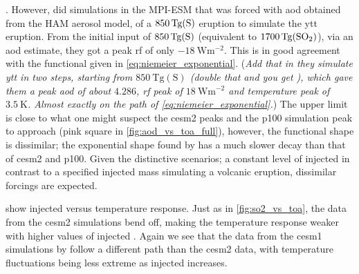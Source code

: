 \documentclass{ametsocV5}
\newcommand{\iso}[1][i]{{#1}njected \ce{SO2}}
\begin{document}
\citet{ottobliesner2016}. However, \citet{timmreck2010} did simulations in the MPI-ESM
that was forced with \ac{aod} obtained from the HAM aerosol model, of a
\(\SI{850}{\tera\gram(\ce{S})}\) eruption to simulate the \ac{ytt} eruption. From the
initial input of \(\SI{850}{\tera\gram(\ce{S})}\) (equivalent to
\(\SI{1700}{\tera\gram(\ce{SO2})}\)), via an \ac{aod} estimate, they got a peak \ac{rf}
of only \(\SI{-18}{\watt\metre^{-2}}\). This is in good agreement with the functional
given in \cref{eq:niemeier_exponential}. (\emph{Add that in \citet{timmreck2010} they
  simulate \ac{ytt} in two steps, starting from \(\SI{850}{\tera\gram(\mathrm{S})}\)
  (double that and you get ), which gave them a peak \ac{aod} of about
  \(\num{4.286}\), \ac{rf} peak of \(\SI{18}{\watt\metre^{-2}}\) and temperature peak of
  \(\SI{3.5}{\kelvin}\). Almost exactly on the path of \cref{eq:niemeier_exponential}.})
The upper limit is close to what one might suspect the \ac{cesm2} peaks and the
\ac{p100} simulation peak to approach (pink square in \cref{fig:aod_vs_toa_full}),
however, the functional shape is dissimilar; the exponential shape found by
\citet{niemeier2015} has a much slower decay than that of \ac{cesm2} and \ac{p100}.
Given the distinctive scenarios; a constant level of \iso{} in contrast to a specified
injected mass simulating a volcanic eruption, dissimilar forcings are expected.


 show \iso{} versus temperature response. Just as in
\cref{fig:so2_vs_toa}, the data from the \ac{cesm2} simulations bend off, making the
temperature response weaker with higher values of \iso. Again we see that the data from
the \ac{cesm1} simulations by \citet{ottobliesner2016} follow a different path than the
\ac{cesm2} data, with temperature fluctuations being less extreme as \iso{} increases.
\end{document}
